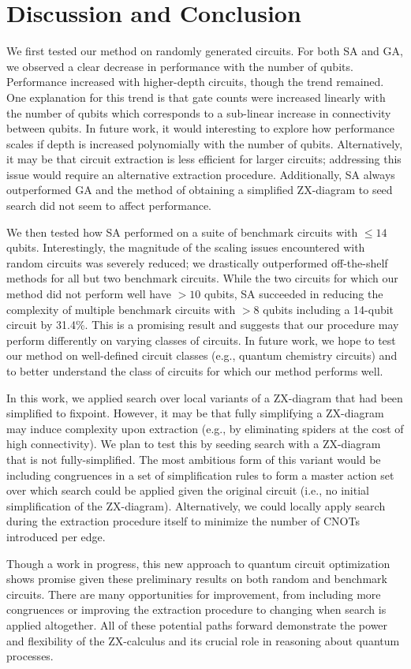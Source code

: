 \chapter[Discussion and Conclusion]{Discussion and Conclusion} \label{ch:discuss-conc}

We first tested our method on randomly generated circuits.
For both SA and GA, we observed a clear decrease in performance with the number of qubits.
Performance increased with higher-depth circuits, though the trend remained.
One explanation for this trend is that gate counts were increased linearly with the number of qubits which corresponds to a sub-linear increase in connectivity between qubits.
In future work, it would interesting to explore how performance scales if depth is increased polynomially with the number of qubits.
Alternatively, it may be that circuit extraction is less efficient for larger circuits;
addressing this issue would require an alternative extraction procedure.
Additionally, SA always outperformed GA and the method of obtaining a simplified ZX-diagram to seed search did not seem to affect performance.

We then tested how SA performed on a suite of benchmark circuits with $\leq 14$ qubits.
Interestingly, the magnitude of the scaling issues encountered with random circuits was severely reduced;
we drastically outperformed off-the-shelf methods for all but two benchmark circuits.
While the two circuits for which our method did not perform well have $>10$ qubits, SA succeeded in reducing the complexity of multiple benchmark circuits with $>8$ qubits including a 14-qubit circuit by 31.4\%.
This is a promising result and suggests that our procedure may perform differently on varying classes of circuits.
In future work, we hope to test our method on well-defined circuit classes (e.g., quantum chemistry circuits) and to better understand the class of circuits for which our method performs well.


In this work, we applied search over local variants of a ZX-diagram that had been simplified to fixpoint.
However, it may be that fully simplifying a ZX-diagram may induce complexity upon extraction (e.g., by eliminating spiders at the cost of high connectivity).
We plan to test this by seeding search with a ZX-diagram that is not fully-simplified.
The most ambitious form of this variant would be including congruences in a set of simplification rules to form a master action set over which search could be applied given the original circuit (i.e., no initial simplification of the ZX-diagram).
Alternatively, we could locally apply search during the extraction procedure itself to minimize the number of CNOTs introduced per edge.

Though a work in progress, this new approach to quantum circuit optimization shows promise given these preliminary results on both random and benchmark circuits.
There are many opportunities for improvement, from including more congruences or improving the extraction procedure to changing when search is applied altogether.
All of these potential paths forward demonstrate the power and flexibility of the ZX-calculus and its crucial role in reasoning about quantum processes.
